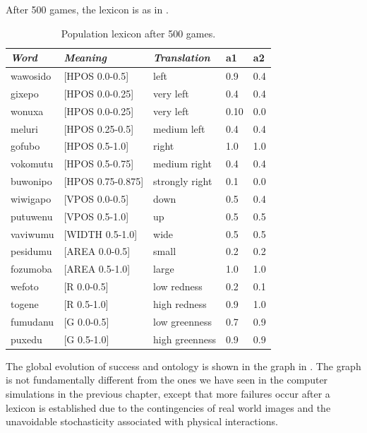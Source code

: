After 500 games, the lexicon is as in . 
\begin{table}
\begin{center}
\begin{tabular}{ l  l  l  l  l } \midrule
{\it Word}&{\it Meaning}&{\it Translation} & {\bf a1}&{\bf a2} \\ \midrule
wawosido & [HPOS 0.0-0.5] &left&0.9&0.4\\ \midrule
gixepo & [HPOS 0.0-0.25] & very left&0.4&0.4\\ \midrule
wonuxa & [HPOS 0.0-0.25] & very left&0.10&0.0\\ \midrule
meluri & [HPOS 0.25-0.5] &medium left&0.4&0.4\\ \midrule
gofubo & [HPOS 0.5-1.0]& right&1.0&1.0\\ \midrule
vokomutu & [HPOS 0.5-0.75] &medium right&0.4&0.4\\ \midrule
buwonipo & [HPOS 0.75-0.875] &strongly right&0.1&0.0\\ \midrule
wiwigapo & [VPOS 0.0-0.5] &down&0.5&0.4\\ \midrule
putuwenu & [VPOS 0.5-1.0]&up & 0.5&0.5\\ \midrule
vaviwumu & [WIDTH 0.5-1.0]&wide & 0.5&0.5\\ \midrule
pesidumu & [AREA 0.0-0.5]&small& 0.2&0.2\\ \midrule
fozumoba & [AREA 0.5-1.0]&large & 1.0&1.0\\ \midrule
wefoto & [R 0.0-0.5]& low redness &0.2&0.1\\ \midrule
togene & [R 0.5-1.0]& high redness &0.9&1.0\\ \midrule
fumudanu & [G 0.0-0.5]& low greenness &0.7&0.9\\ \midrule
puxedu & [G 0.5-1.0]& high greenness &0.9&0.9\\ \midrule
\end{tabular}
\caption{ \label{tab:puxedu} Population lexicon after 500 games.}
\end{center}
\end{table}
The global evolution of success and ontology is shown in the 
graph in . The graph is not 
fundamentally different from the ones we have
seen in the computer simulations in the previous
chapter, except that more failures occur after a lexicon
is established due to the contingencies of real 
world images and the unavoidable stochasticity 
associated with physical interactions. 

